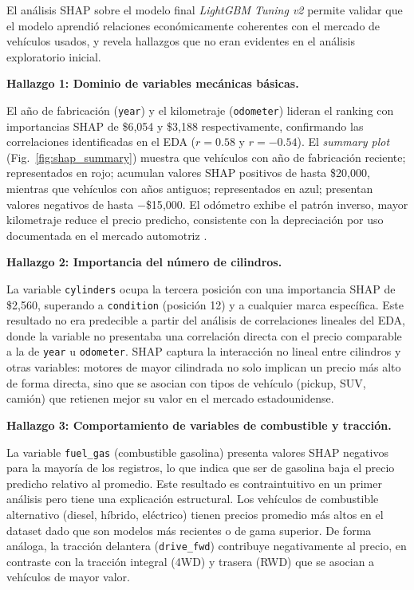 \documentclass[conference]{IEEEtran}
\begin{document}
El análisis SHAP sobre el modelo final \textit{LightGBM Tuning v2} permite validar que el modelo aprendió relaciones económicamente coherentes con el mercado de vehículos usados, y revela hallazgos que no eran evidentes en el análisis exploratorio inicial.

\textbf{Hallazgo 1: Dominio de variables mecánicas básicas.} 

El año de fabricación (\texttt{year}) y el kilometraje (\texttt{odometer}) lideran el ranking con importancias SHAP de \$6{,}054 y \$3{,}188 respectivamente, confirmando las correlaciones identificadas en el EDA ($r{=}0.58$ y $r{=}{-}0.54$). El \textit{summary plot} (Fig.~\ref{fig:shap_summary}) muestra que vehículos con año de fabricación reciente; representados en rojo; acumulan valores SHAP positivos de hasta \$20{,}000, mientras que vehículos con años antiguos; representados en azul; presentan valores negativos de hasta $-$\$15{,}000. El odómetro exhibe el patrón inverso, mayor kilometraje reduce el precio predicho, consistente con la depreciación por uso documentada en el mercado automotriz \cite{aggarwal2016}.

\textbf{Hallazgo 2: Importancia del número de cilindros.} 

La variable \texttt{cylinders} ocupa la tercera posición con una importancia SHAP de \$2{,}560, superando a \texttt{condition} (posición 12) y a cualquier marca específica. Este resultado no era predecible a partir del análisis de correlaciones lineales del EDA, donde la variable no presentaba una correlación directa con el precio comparable a la de \texttt{year} u \texttt{odometer}. SHAP captura la interacción no lineal entre cilindros y otras variables: motores de mayor cilindrada no solo implican un precio más alto de forma directa, sino que se asocian con tipos de vehículo (pickup, SUV, camión) que retienen mejor su valor en el mercado estadounidense.

\textbf{Hallazgo 3: Comportamiento de variables de combustible y tracción.} 

La variable \texttt{fuel\_gas} (combustible gasolina) presenta valores SHAP negativos para la mayoría de los registros, lo que indica que ser de gasolina baja el precio predicho relativo al promedio. Este resultado es contraintuitivo en un primer análisis pero tiene una explicación estructural. Los vehículos de combustible alternativo (diesel, híbrido, eléctrico) tienen precios promedio más altos en el dataset dado que son modelos más recientes o de gama superior. De forma análoga, la tracción delantera (\texttt{drive\_fwd}) contribuye negativamente al precio, en contraste con la tracción integral (4WD) y trasera (RWD) que se asocian a vehículos de mayor valor.
\end{document}
